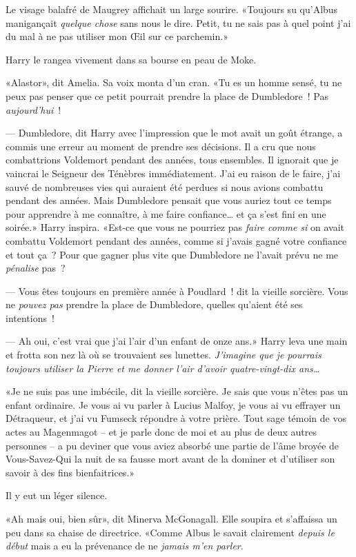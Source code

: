 Le visage balafré de Maugrey affichait un large sourire. «Toujours su qu'Albus manigançait \emph{quelque chose} sans nous le dire. Petit, tu ne sais pas à quel point j'ai du mal à ne pas utiliser mon Œil sur ce parchemin.»

Harry le rangea vivement dans sa bourse en peau de Moke.

«Alastor», dit Amelia. Sa voix monta d'un cran. «Tu es un homme sensé, tu ne peux pas penser que ce petit pourrait prendre la place de Dumbledore~! Pas \emph{aujourd'hui}~!

--- Dumbledore, dit Harry avec l'impression que le mot avait un goût étrange, a commis une erreur au moment de prendre ses décisions. Il a cru que nous combattrions Voldemort pendant des années, tous ensembles. Il ignorait que je vaincrai le Seigneur des Ténèbres immédiatement. J'ai eu raison de le faire, j'ai sauvé de nombreuses vies qui auraient été perdues si nous avions combattu pendant des années. Mais Dumbledore pensait que vous auriez tout ce temps pour apprendre à me connaître, à me faire confiance… et ça s'est fini en une soirée.» Harry inspira. «Est-ce que vous ne pourriez pas \emph{faire comme si} on avait combattu Voldemort pendant des années, comme si j'avais gagné votre confiance et tout ça~? Pour que gagner plus vite que Dumbledore ne l'avait prévu ne me \emph{pénalise} pas~?

--- Vous êtes toujours en première année à Poudlard~! dit la vieille sorcière. Vous ne \emph{pouvez pas} prendre la place de Dumbledore, quelles qu'aient été ses intentions~!

--- Ah oui, c'est vrai que j'ai l'air d'un enfant de onze ans.» Harry leva une main et frotta son nez là où se trouvaient ses lunettes. \emph{J'imagine que je pourrais toujours utiliser la Pierre et me donner l'air d'avoir quatre-vingt-dix ans…}

«Je ne suis pas une imbécile, dit la vieille sorcière. Je sais que vous n'êtes pas un enfant ordinaire. Je vous ai vu parler à Lucius Malfoy, je vous ai vu effrayer un Détraqueur, et j'ai vu Fumseck répondre à votre prière. Tout sage témoin de vos actes au Magenmagot -- et je parle donc de moi et au plus de deux autres personnes -- a pu deviner que vous aviez absorbé une partie de l'âme broyée de Vous-Savez-Qui la nuit de sa fausse mort avant de la dominer et d'utiliser son savoir à des fins bienfaitrices.»

Il y eut un léger silence.

«Ah mais oui, bien sûr», dit Minerva McGonagall. Elle soupira et s'affaissa un peu dans sa chaise de directrice. «Comme Albus le savait clairement \emph{depuis le début} mais a eu la prévenance de ne \emph{jamais m'en parler}.

